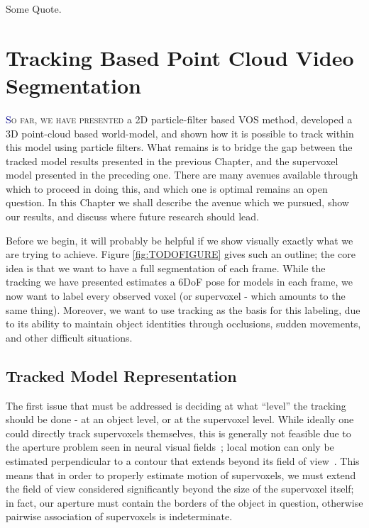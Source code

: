 \begin{savequote}[75mm]
Some Quote.
\end{savequote}


\chapter{Tracking Based Point Cloud Video Segmentation}
\label{Chap:TrackingBasedSegmentation}
\lettrine[lines=3, loversize=0.3]{\textcolor{DarkBlue}S}{o far, we have presented} a 2D particle-filter based VOS method, developed a 3D point-cloud based world-model, and shown how it is possible to track within this model using particle filters. What remains is to bridge the gap between the tracked model results presented in the previous Chapter, and the supervoxel model presented in the preceding one. There are many avenues available through which to proceed in doing this, and which one is optimal remains an open question. In this Chapter we shall describe the avenue which we pursued, show our results, and discuss where future research should lead.

Before we begin, it will probably be helpful if we show visually exactly what we are trying to achieve. Figure \ref{fig:TODOFIGURE} gives such an outline; the core idea is that we want to have a full segmentation of each frame.  While the tracking we have presented estimates a 6DoF pose for models in each frame, we now want to label every observed voxel (or supervoxel - which amounts to the same thing). Moreover, we want to use tracking as the basis for this labeling, due to its ability to maintain object identities through occlusions, sudden movements, and other difficult situations. 


\section{Tracked Model Representation}
The first issue that must be addressed is deciding at what ``level'' the tracking should be done - at an object level, or at the supervoxel level. While ideally one could directly track supervoxels themselves, this is generally not feasible due to the aperture problem seen in neural visual fields~\cite{MarrApertureProblem}; local motion can only be estimated perpendicular to a contour that extends beyond its field of view~\cite{shimojo1989}. This means that in order to properly estimate motion of supervoxels, we must extend the field of view considered significantly beyond the size of the supervoxel itself; in fact, our aperture must contain the borders of the object in question, otherwise pairwise association of supervoxels is indeterminate. 


